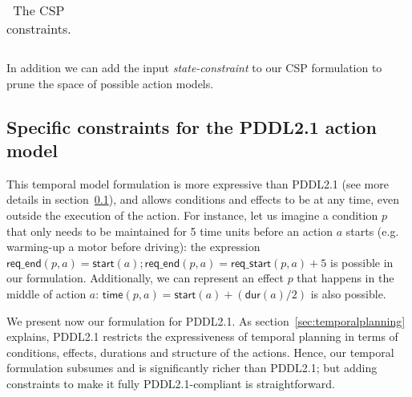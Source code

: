 \documentclass{ecai}
\newcommand{\dur}{\mathsf{dur}}    %
\newcommand{\start}{\mathsf{start}}%
\newcommand{\tim}{\mathsf{time}}   %
\newcommand{\reqs}{\mathsf{req\_{start}}} %
\newcommand{\reqe}{\mathsf{req\_{end}}}   %
\begin{document}
\begin{table}
\begin{scriptsize}
\begin{tabular}{ll}
\end{tabular}
\end{scriptsize}
\caption{\small The CSP constraints.}
\label{table:constraints}
\end{table}

In addition we can add the input {\em state-constraint} to our CSP formulation to prune the space of possible action models.



\subsection{Specific constraints for the PDDL2.1 action model}
\label{sec:PDDL21constraints}
This temporal model formulation is more expressive than PDDL2.1 (see more details in section~\ref{sec:PDDL21constraints}), and allows conditions and effects to be at any time, even outside the execution of the action. For instance, let us imagine a condition $p$ that only needs to be maintained for 5 time units before an action $a$ starts (e.g. warming-up a motor before driving): the expression $\reqe(p,a)=\start(a); \reqe(p,a) = \reqs(p,a)+5$ is possible in our formulation. Additionally, we can represent an effect $p$ that happens in the middle of action $a$: $\tim(p,a) = \start(a)+ (\dur(a) / 2)$ is also possible.

We present now our formulation for PDDL2.1. As section~\ref{sec:temporalplanning} explains, PDDL2.1 restricts the expressiveness of temporal planning in terms of conditions, effects, durations and structure of the actions. Hence, our temporal formulation subsumes and is significantly richer than PDDL2.1; but adding constraints to make it fully PDDL2.1-compliant is straightforward.
\end{document}
